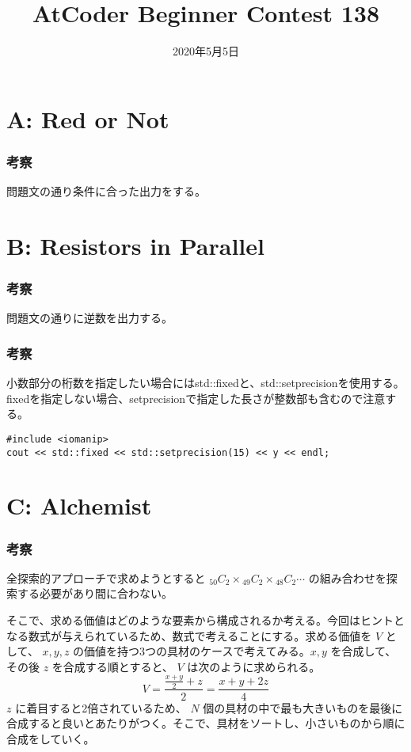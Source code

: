 \documentclass{jarticle}
\title{AtCoder Beginner Contest 138}
\date{2020年5月5日}
\begin{document}
\maketitle

\section*{A: Red or Not}
\subsubsection*{考察}
問題文の通り条件に合った出力をする。


\section*{B: Resistors in Parallel}
\subsubsection*{考察}
問題文の通りに逆数を出力する。

\subsubsection*{考察}
小数部分の桁数を指定したい場合にはstd::fixedと、std::setprecisionを使用する。fixedを指定しない場合、setprecisionで指定した長さが整数部も含むので注意する。

\vspace{\baselineskip}
\begin{lstlisting}
#include <iomanip>
cout << std::fixed << std::setprecision(15) << y << endl;
\end{lstlisting}


\section*{C: Alchemist}
\subsubsection*{考察}
全探索的アプローチで求めようとすると ${}_{50}C_2 \times {}_{49}C_2 \times {}_{48}C_2 \cdots$ の組み合わせを探索する必要があり間に合わない。

そこで、求める価値はどのような要素から構成されるか考える。今回はヒントとなる数式が与えられているため、数式で考えることにする。求める価値を $V$ として、 $x, y, z$ の価値を持つ3つの具材のケースで考えてみる。$x, y$ を合成して、その後 $z$ を合成する順とすると、 $V$ は次のように求められる。
\begin{displaymath}
V = \frac{\frac{x + y}{2} + z}{2} = \frac{x + y + 2z}{4}
\end{displaymath}
$z$ に着目すると2倍されているため、 $N$ 個の具材の中で最も大きいものを最後に合成すると良いとあたりがつく。そこで、具材をソートし、小さいものから順に合成をしていく。
\end{document}
